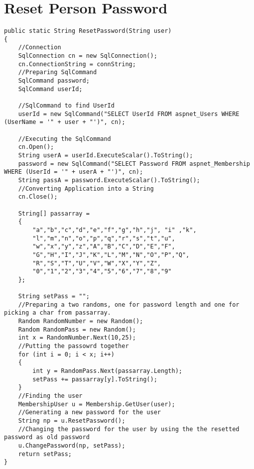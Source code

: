 \section{Reset Person Password}
\label{sec:resetpersonpassword}

\begin{lstlisting}[style=sourceCode, caption=\myCaption{The ResetPassword(String user) method}, label=lst:resetpersonpassword]
public static String ResetPassword(String user)
{   
    //Connection
    SqlConnection cn = new SqlConnection();
    cn.ConnectionString = connString;
    //Preparing SqlCommand
    SqlCommand password;
    SqlCommand userId;

    //SqlCommand to find UserId
    userId = new SqlCommand("SELECT UserId FROM aspnet_Users WHERE (UserName = '" + user + "')", cn);
    
    //Executing the SqlCommand
    cn.Open();
    String userA = userId.ExecuteScalar().ToString();
    password = new SqlCommand("SELECT Password FROM aspnet_Membership WHERE (UserId = '" + userA + "')", cn);
    String passA = password.ExecuteScalar().ToString();
    //Converting Application into a String
    cn.Close();

    String[] passarray =
    {
        "a","b","c","d","e","f","g","h","j", "i" ,"k",
        "l","m","n","o","p","q","r","s","t","u",
        "w","x","y","z","A","B","C","D","E","F",
        "G","H","I","J","K","L","M","N","O","P","Q",
        "R","S","T","U","V","W","X","Y","Z",
        "0","1","2","3","4","5","6","7","8","9"
    };

    String setPass = "";
    //Preparing a two randoms, one for password length and one for picking a char from passarray.
    Random RandomNumber = new Random();
    Random RandomPass = new Random();
    int x = RandomNumber.Next(10,25);
    //Putting the passowrd together
    for (int i = 0; i < x; i++)
    {
        int y = RandomPass.Next(passarray.Length);
        setPass += passarray[y].ToString();
    }
    //Finding the user
    MembershipUser u = Membership.GetUser(user);
    //Generating a new password for the user
    String np = u.ResetPassword();
    //Changing the password for the user by using the the resetted password as old password
    u.ChangePassword(np, setPass);
    return setPass;
}
\end{lstlisting}